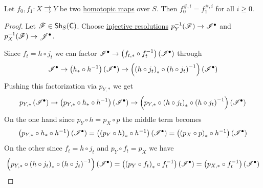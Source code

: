 \documentclass[../../main]{subfiles}
\begin{document}
\begin{theorem}\label{thm:homotopy-invariance-cohomology}
  Let \(f_{0}, f_{1}\colon X \rightrightarrows Y\) be two \hyperref[def:homotopy-over]{homotopic maps} over \(S\).
  Then \(f_{0}^{\#, i} = f_{1}^{\#, i}\) for all \(i \geq 0\).
\end{theorem}
\begin{proof}
  Let \(\mathscr{F} \in \mathsf{Sh}_{S}(\mathsf{C})\).
  Choose \hyperref[def:resolution]{injective resolutions} \(p_{Y}^{-1}(\mathscr{F}) \to \mathscr{I}^{\bullet}\) and \(p_{X}^{-1}(\mathscr{F}) \to \mathscr{J}^{\bullet}\).

  Since \(f_{t} = h \circ j_{t}\) we can factor \(\mathscr{I}^{\bullet} \to \left( f_{t, \ast} \circ f_{t}^{-1} \right)(\mathscr{I}^{\bullet})\) through
  \begin{equation*}
    \mathscr{I}^{\bullet} \to \left( h_{\ast} \circ h^{-1} \right) \left( \mathscr{I}^{\bullet} \right) \to \left(\left( h \circ j_{t} \right)_{\ast} \circ \left( h \circ j_{t} \right)^{-1}\right) \left(\mathscr{I}^{\bullet}\right)
  \end{equation*}
  Pushing this factorization via \(p_{Y, \ast}\) we get
  \begin{equation*}
     p_{Y, \ast} \left(\mathscr{I}^{\bullet}\right) \to \left( p_{Y, \ast} \circ h_{\ast} \circ h^{-1} \right) \left( \mathscr{I}^{\bullet} \right) \to \left(p_{Y, \ast} \circ \left( h \circ j_{t} \right)_{\ast} \circ \left( h \circ j_{t} \right)^{-1}\right) \left(\mathscr{I}^{\bullet}\right)
  \end{equation*}
  On the one hand since \(p_{Y} \circ h = p_{X} \circ p\) the middle term becomes
  \begin{equation*}
    \left( p_{Y, \ast} \circ h_{\ast} \circ h^{-1} \right) \left( \mathscr{I}^{\bullet} \right) = \left( \left( p_{Y} \circ h \right)_{\ast} \circ h^{-1} \right) \left( \mathscr{I}^{\bullet} \right) = \left( \left( p_{X} \circ p \right)_{\ast} \circ h^{-1} \right) \left( \mathscr{I}^{\bullet} \right)
  \end{equation*}
  On the other since \(f_{t} = h \circ j_{t}\) and \(p_{Y} \circ f_{t} = p_{X}\) we have
  \begin{equation*}
    \left(p_{Y, \ast} \circ \left( h \circ j_{t} \right)_{\ast} \circ \left( h \circ j_{t} \right)^{-1}\right) \left(\mathscr{I}^{\bullet}\right) = \left( \left( p_{Y} \circ f_{t} \right)_{\ast} \circ f_{t}^{-1} \right) \left( \mathscr{I}^{\bullet} \right) = \left( p_{X, \ast} \circ f_{t}^{-1} \right) \left( \mathscr{I}^{\bullet} \right)
  \end{equation*}

\end{proof}
\end{document}
